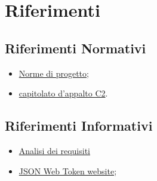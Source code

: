 \section{Riferimenti}
\subsection{Riferimenti Normativi}
\begin{itemize}
    \item \href{https://github.com/SWEasabi/norme-di-progetto/releases}{Norme di progetto};
    \item \href{https://www.math.unipd.it/~tullio/IS-1/2022/Progetto/C2.pdf}{capitolato d'appalto C2}.
\end{itemize}

\subsection{Riferimenti Informativi}
\begin{itemize}
    \item \href{https://github.com/SWEasabi/analisi-dei-requisiti/releases}{Analisi dei requisiti}
    \item \href{https://jwt.io/}{JSON Web Token website};
\end{itemize}